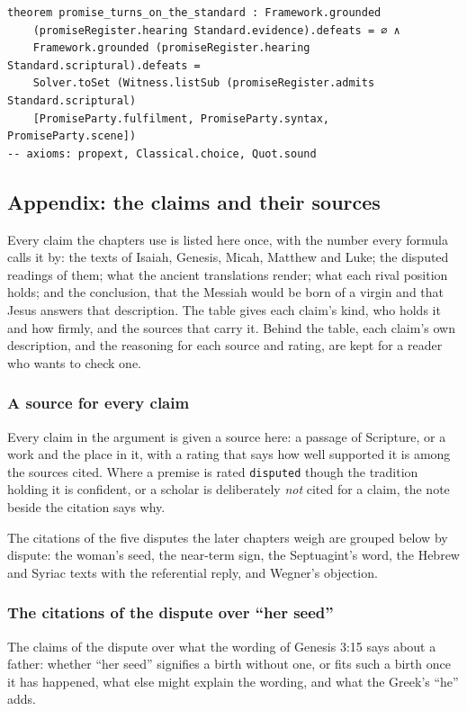 \documentclass[11pt]{article}
\begin{document}
{\small\begin{verbatim}
theorem promise_turns_on_the_standard : Framework.grounded
    (promiseRegister.hearing Standard.evidence).defeats = ∅ ∧
    Framework.grounded (promiseRegister.hearing Standard.scriptural).defeats =
    Solver.toSet (Witness.listSub (promiseRegister.admits Standard.scriptural)
    [PromiseParty.fulfilment, PromiseParty.syntax, PromiseParty.scene])
-- axioms: propext, Classical.choice, Quot.sound
\end{verbatim}}
\subsection*{Appendix: the claims and their sources}
Every claim the chapters use is listed here once, with the number every formula calls it by: the texts of Isaiah, Genesis, Micah, Matthew and Luke; the disputed readings of them; what the ancient translations render; what each rival position holds; and the conclusion, that the Messiah would be born of a virgin and that Jesus answers that description. The table gives each claim’s kind, who holds it and how firmly, and the sources that carry it. Behind the table, each claim’s own description, and the reasoning for each source and rating, are kept for a reader who wants to check one.

\subsubsection*{A source for every claim}
Every claim in the argument is given a source here: a passage of Scripture, or a work and the place in it, with a rating that says how well supported it is among the sources cited. Where a premise is rated \texttt{disputed} though the tradition holding it is confident, or a scholar is deliberately \emph{not} cited for a claim, the note beside the citation says why.

The citations of the five disputes the later chapters weigh are grouped below by dispute: the woman’s seed, the near-term sign, the Septuagint’s word, the Hebrew and Syriac texts with the referential reply, and Wegner’s objection.

\subsubsection*{The citations of the dispute over “her seed”}
The claims of the dispute over what the wording of Genesis 3:15 says about a father: whether “her seed” signifies a birth without one, or fits such a birth once it has happened, what else might explain the wording, and what the Greek’s “he” adds.
\end{document}
